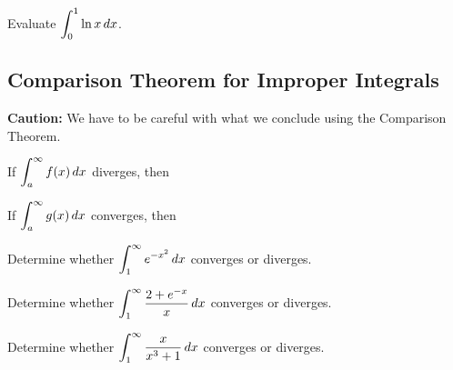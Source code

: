 \documentclass[12pt]{article}
\begin{document}
\newpage

\Example Evaluate $\displaystyle\int_0^1\ln x\,dx$.

\newpage

\subsection*{Comparison Theorem for Improper Integrals}


\vspace{5mm}

\textbf{Caution:} We have to be careful with what we conclude using the Comparison Theorem.

\vspace{5mm}

If $\displaystyle\int_a^\infty f(x)\,dx$ diverges, then

\vspace{23mm}

If $\displaystyle\int_a^\infty g(x)\,dx$ converges, then

\vspace{23mm}

\Example Determine whether $\displaystyle\int_1^\infty e^{-x^2}\,dx$ converges or diverges.

\newpage



\Example Determine whether $\displaystyle\int_1^\infty\frac{2+e^{-x}}{x}\,dx$ converges or diverges.

\vfill

\Example Determine whether $\displaystyle\int_1^\infty\frac{x}{x^3+1}\,dx$ converges or diverges.

\vfill
\end{document}
